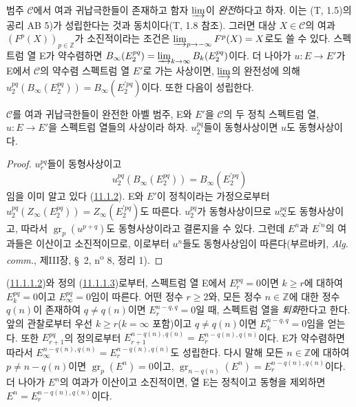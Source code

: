 \begin{env}[11.1.4]
\label{0.11.1.4-fr}
범주 $\mathcal C$에서 여과 귀납극한들이 존재하고 함자 $\varinjlim$이
\emph{완전}하다고 하자. 이는 (T, 1.5)의 공리 AB 5)가 성립한다는 것과
동치이다(T, 1.8 참조). 그러면 대상 $X\in\mathcal C$의 여과
$(F^p(X))_{p\in\mathbb Z}$가 소진적이라는 조건은
$\varinjlim_{p\to-\infty}F^p(X)=X$로도 쓸 수 있다. 스펙트럼 열 E가
약수렴하면
$B_\infty(E_2^{pq})=\varinjlim_{k\to\infty}B_k(E_2^{pq})$이다. 더
나아가 $u:E\to E'$가 E에서 $\mathcal C$의 약수렴 스펙트럼 열 $E'$로
가는 사상이면, $\varinjlim$의 완전성에 의해
$u_2^{pq}(B_\infty(E_2^{pq}))=B_\infty(E_2^{\prime pq})$이다. 또한
다음이 성립한다.
\end{env}

\begin{proposition}[11.1.5]
\label{0.11.1.5-fr}
$\mathcal C$를 여과 귀납극한들이 완전한 아벨 범주, E와 $E'$을
$\mathcal C$의 두 정칙 스펙트럼 열, $u:E\to E'$을 스펙트럼 열들의
사상이라 하자. $u_2^{pq}$들이 동형사상이면 $u$도 동형사상이다.
\end{proposition}

\begin{proof}
$u_r^{pq}$들이 동형사상이고
\[
  u_2^{pq}(B_\infty(E_2^{pq}))=B_\infty(E_2^{\prime pq})
\]
임을 이미 알고 있다 (\hyperref[0.11.1.2-fr]{11.1.2}).
E와 $E'$이 정칙이라는 가정으로부터
$u_2^{pq}(Z_\infty(E_2^{pq}))=Z_\infty(E_2^{\prime pq})$도 따른다.
$u_2^{pq}$가 동형사상이므로 $u_\infty^{pq}$도 동형사상이고, 따라서
$\operatorname{gr}_p(u^{p+q})$도 동형사상이라고 결론지을 수 있다.
그런데 $E^n$과 $E^{\prime n}$의 여과들은 이산이고 소진적이므로,
이로부터 $u^n$들도 동형사상임이 따른다(부르바키,
\emph{Alg. comm.}, 제III장, \S~2, n\textsuperscript{o} 8, 정리 1).
\end{proof}

\begin{env}[11.1.6]
\label{0.11.1.6-fr}
(\hyperref[0.11.1.1.2-fr]{11.1.1.2})와 정의
(\hyperref[0.11.1.1.3-fr]{11.1.1.3})로부터, 스펙트럼 열 E에서
$E_r^{pq}=0$이면 $k\geq r$에 대하여 $E_k^{pq}=0$이고
$E_\infty^{pq}=0$임이 따른다. 어떤 정수 $r\geq2$와, 모든 정수
$n\in\mathbb Z$에 대한 정수 $q(n)$이 존재하여 $q\ne q(n)$이면
$E_r^{n-q,q}=0$일 때, 스펙트럼 열을 \emph{퇴화}한다고 한다. 앞의
관찰로부터 우선 $k\geq r$($k=\infty$ 포함)이고 $q\ne q(n)$이면
$E_k^{n-q,q}=0$임을 얻는다. 또한 $E_{r+1}^{pq}$의 정의로부터
$E_{r+1}^{n-q(n),q(n)}=E_r^{n-q(n),q(n)}$이다. E가 약수렴하면 따라서
$E_\infty^{n-q(n),q(n)}=E_r^{n-q(n),q(n)}$도 성립한다. 다시 말해 모든
$n\in\mathbb Z$에 대하여 $p\ne n-q(n)$이면
$\operatorname{gr}_p(E^n)=0$이고,
$\operatorname{gr}_{n-q(n)}(E^n)=E_r^{n-q(n),q(n)}$이다. 더 나아가
$E^n$의 여과가 이산이고 소진적이면, 열 E는 정칙이고 동형을 제외하면
$E^n=E_r^{n-q(n),q(n)}$이다.
\end{env}

